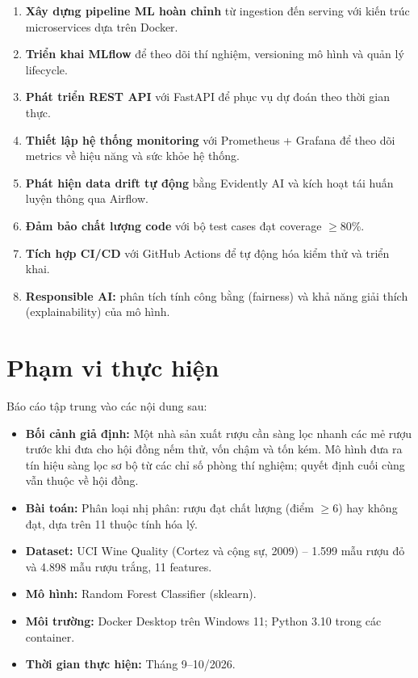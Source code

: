 \documentclass[12pt,a4paper]{report}
\begin{document}
\begin{enumerate}[label=\textbf{\arabic*.}]
  \item \textbf{Xây dựng pipeline ML hoàn chỉnh} từ ingestion đến serving với kiến trúc microservices dựa trên Docker.
  \item \textbf{Triển khai MLflow} để theo dõi thí nghiệm, versioning mô hình và quản lý lifecycle.
  \item \textbf{Phát triển REST API} với FastAPI để phục vụ dự đoán theo thời gian thực.
  \item \textbf{Thiết lập hệ thống monitoring} với Prometheus + Grafana để theo dõi metrics về hiệu năng và sức khỏe hệ thống.
  \item \textbf{Phát hiện data drift tự động} bằng Evidently AI và kích hoạt tái huấn luyện thông qua Airflow.
  \item \textbf{Đảm bảo chất lượng code} với bộ test cases đạt coverage $\geq$80\%.
  \item \textbf{Tích hợp CI/CD} với GitHub Actions để tự động hóa kiểm thử và triển khai.
  \item \textbf{Responsible AI:} phân tích tính công bằng (fairness) và khả năng giải thích (explainability) của mô hình.
\end{enumerate}

\section{Phạm vi thực hiện}

Báo cáo tập trung vào các nội dung sau:
\begin{itemize}
  \item \textbf{Bối cảnh giả định:} Một nhà sản xuất rượu cần sàng lọc nhanh các mẻ rượu trước khi đưa cho hội đồng nếm thử, vốn chậm và tốn kém. Mô hình đưa ra tín hiệu sàng lọc sơ bộ từ các chỉ số phòng thí nghiệm; quyết định cuối cùng vẫn thuộc về hội đồng.
  \item \textbf{Bài toán:} Phân loại nhị phân: rượu đạt chất lượng (điểm $\geq 6$) hay không đạt, dựa trên 11 thuộc tính hóa lý.
  \item \textbf{Dataset:} UCI Wine Quality (Cortez và cộng sự, 2009) -- 1.599 mẫu rượu đỏ và 4.898 mẫu rượu trắng, 11 features.
  \item \textbf{Mô hình:} Random Forest Classifier (sklearn).
  \item \textbf{Môi trường:} Docker Desktop trên Windows 11; Python 3.10 trong các container.
  \item \textbf{Thời gian thực hiện:} Tháng 9--10/2026.
\end{itemize}
\end{document}
